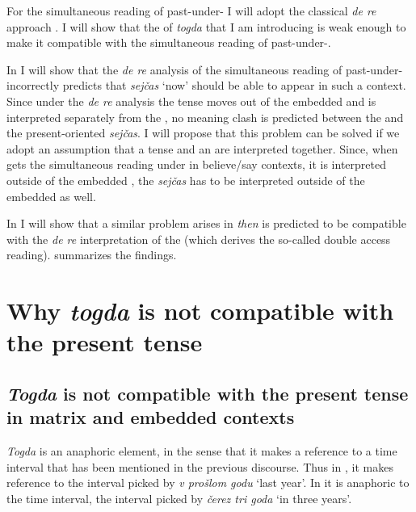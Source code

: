 \documentclass[output=paper,modfonts,newtxmath,hidelinks]{langscibook}
\begin{document}
For the simultaneous reading of past-under- I will adopt the classical \textit{de re} approach \citep{Abusch1997,Heim1994}. I will show that the  of \textit{togda} that I am introducing is weak enough to make it compatible with the simultaneous reading of past-under-.

In  I will show that the \textit{de re} analysis of the simultaneous reading of past-under- incorrectly predicts that  \textit{sejčas} ‘now’ should be able to appear in such a context. Since under the \textit{de re} analysis the tense moves out of the embedded  and is interpreted separately from the , no meaning clash is predicted between the  and the present-oriented  \textit{sejčas}. I will propose that this problem can be solved if we adopt an assumption that a tense and an  are interpreted together. Since, when  gets the simultaneous reading under  in believe/say contexts, it is interpreted outside of the embedded , the  \textit{sejčas} has to be interpreted outside of the embedded  as well.

In  I will show that a similar problem arises in  \textit{then} is predicted to be compatible with the \textit{de re} interpretation of the  (which derives the so-called double access reading).  summarizes the findings.

\section{Why \textit{togda} is not compatible with the present tense}\label{20:s2}
\subsection{\textit{Togda} is not compatible with the present tense in matrix and embedded contexts}\label{20:s2.1}

\textit{Togda} is an anaphoric element, in the sense that it makes a reference to a time interval that has been mentioned in the previous discourse. Thus in , it makes reference to the interval picked by \textit{v prošlom godu} ‘last year’. In  it is anaphoric to the  time interval, the interval picked by \textit{čerez tri goda} ‘in three years’.
\end{document}
